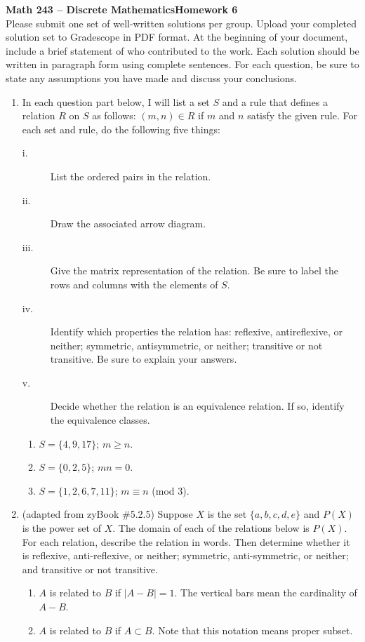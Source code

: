 \documentclass{article}
\begin{document}
\textbf{Math 243 -- Discrete Mathematics}\hfill\textbf{Homework 6 }\\[0.0625in]



Please submit one set of well-written solutions per group.  Upload your completed solution set to Gradescope in PDF format. At the beginning of your document, include a brief statement of who contributed to the work.  Each solution should be written in paragraph form using complete sentences.  For each question, be sure to state any assumptions you have made and discuss your conclusions. 

\medskip
\begin{enumerate}

\item In each question part below, I will list a set $S$ and a rule that defines a relation $R$ on $S$ as follows: $(m,n) \in R$ if $m$ and $n$ satisfy the given rule. For each set and rule, do the following five things:
\begin{description}
	\item[   i. ] List the ordered pairs in the relation.  
	\item[ ii. ] Draw the associated arrow diagram.
	\item[iii. ] Give the matrix representation of the relation.  Be sure to label the rows and columns with the elements of $S$. 
	\item[iv. ] Identify which properties the relation has: reflexive, antireflexive, or neither; symmetric, antisymmetric, or neither; transitive or not transitive.  Be sure to explain your answers.
	\item[ v. ] Decide whether the relation is an equivalence relation.  If so, identify the equivalence classes.

\end{description}


\begin{enumerate} 

\item $S=\{4,9,17\}$;  $m \ge n$.
\item $S=\{0,2,5\}$;  $mn=0$.
\item $S=\{1,2,6,7,11\}$;  $m \equiv n$ (mod 3).
\end{enumerate}
\bigskip

\item (adapted from zyBook \#5.2.5) Suppose $X$ is the set $\{a,b,c,d,e\}$ and $P(X)$ is the power set of $X$.  The domain of each of the relations below is $P(X)$. For each relation, describe the relation in words. Then determine whether it is reflexive, anti-reflexive, or neither; symmetric, anti-symmetric, or neither; and transitive or not transitive. 
\begin{enumerate}
\item $A$ is related to $B$ if $|A-B|=1$.  The vertical bars mean the cardinality of $A-B$.
\item  $A$ is related to $B$ if $A \subset B$.  Note that this notation means proper subset.
\end{enumerate}


\end{enumerate}
\end{document}
